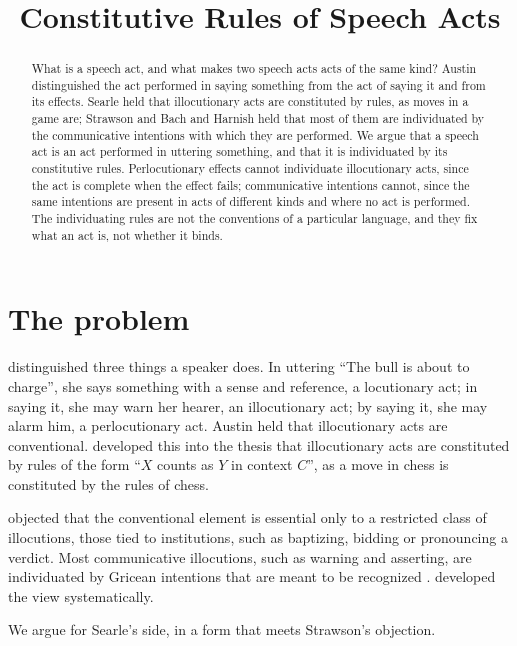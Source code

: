 \documentclass{situationist-preprint}
\title{Constitutive Rules of Speech Acts}
\begin{document}
\maketitle

\begin{abstract}
What is a speech act, and what makes two speech acts acts of the same kind? Austin distinguished the act performed in saying something from the act of saying it and from its effects. Searle held that illocutionary acts are constituted by rules, as moves in a game are; Strawson and Bach and Harnish held that most of them are individuated by the communicative intentions with which they are performed. We argue that a speech act is an act performed in uttering something, and that it is individuated by its constitutive rules. Perlocutionary effects cannot individuate illocutionary acts, since the act is complete when the effect fails; communicative intentions cannot, since the same intentions are present in acts of different kinds and where no act is performed. The individuating rules are not the conventions of a particular language, and they fix what an act is, not whether it binds.
\end{abstract}

\section{The problem}

\citet{Austin1962} distinguished three things a speaker does. In uttering \enquote{The bull is about to charge}, she says something with a sense and reference, a locutionary act; in saying it, she may warn her hearer, an illocutionary act; by saying it, she may alarm him, a perlocutionary act. Austin held that illocutionary acts are conventional. \citet{Searle1969} developed this into the thesis that illocutionary acts are constituted by rules of the form \enquote{$X$ counts as $Y$ in context $C$}, as a move in chess is constituted by the rules of chess.

\citet{Strawson1964} objected that the conventional element is essential only to a restricted class of illocutions, those tied to institutions, such as baptizing, bidding or pronouncing a verdict. Most communicative illocutions, such as warning and asserting, are individuated by Gricean intentions that are meant to be recognized \citep{Grice1957}. \citet{BachHarnish1979} developed the view systematically.

We argue for Searle's side, in a form that meets Strawson's objection.
\end{document}
